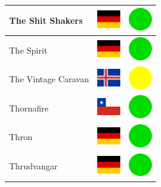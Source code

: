 \documentclass[12pt, a4paper, twoside]{report}
\begin{document}
\begin{center}
\begin{longtable}{|p{5cm}|p{2cm}|p{2cm}|}
The Shit Shakers & \includegraphics[width=1cm]{4x3/de} & \includegraphics[width=1cm]{likes/y} \\ \hline
The Spirit & \includegraphics[width=1cm]{4x3/de} & \includegraphics[width=1cm]{likes/y} \\ \hline
The Vintage Caravan & \includegraphics[width=1cm]{4x3/is} & \includegraphics[width=1cm]{likes/m} \\ \hline
Thornafire & \includegraphics[width=1cm]{4x3/cl} & \includegraphics[width=1cm]{likes/y} \\ \hline
Thron & \includegraphics[width=1cm]{4x3/de} & \includegraphics[width=1cm]{likes/y} \\ \hline
Thrudvangar & \includegraphics[width=1cm]{4x3/de} & \includegraphics[width=1cm]{likes/y} \\ \hline

\end{longtable}
\end{center}
\end{document}
